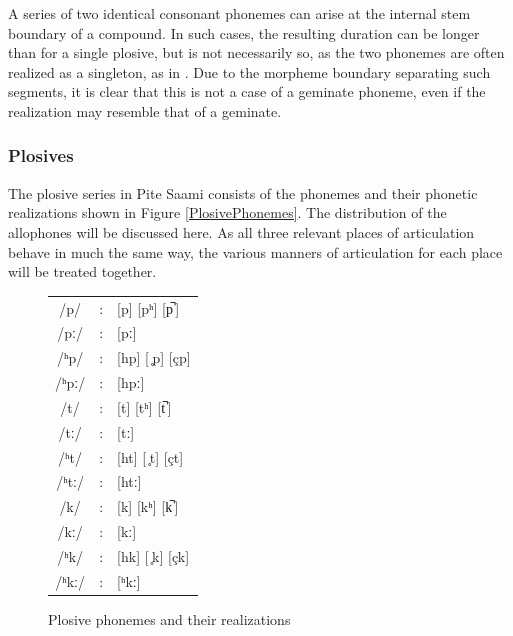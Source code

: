 A series of two identical consonant phonemes can arise at the internal stem boundary of a compound. In such cases, the resulting duration can be longer than for a single plosive, but is not necessarily so, as the two phonemes are often realized as a singleton, as in .
Due to the morpheme boundary separating such segments, it is clear that this is not a case of a geminate phoneme, even if the realization may resemble that of a geminate. 


\subsubsection{Plosives}\label{Plosives}%
The plosive series in Pite Saami consists of the phonemes and their phonetic realizations shown in Figure \vref{PlosivePhonemes}. The distribution of the allophones will be discussed here. As all three relevant places of articulation behave in much the same way, the various manners of articulation for each place will be treated together.
\begin{figure}\begin{center}
\begin{tabular}{c c l}
/p/ &:& [p] [pʰ] [p̚\,] \\ %
/pː/ &:& [pː] \\ %
/ʰp/ &:& [hp] [ ̥p] [çp]  \\ %
/ʰpː/ &:& [hpː] \\ %
/t/ &:& [t] [tʰ] [t̚\,] \\%
/tː/ &:& [tː] \\
/ʰt/ &:& [ht] [ ̥t] [çt] \\
/ʰtː/ &:& [htː] \\
/k/ &:& [k] [kʰ] [k̚\,] \\
/kː/ &:& [kː] \\
/ʰk/ &:& [hk] [ ̥k] [çk]  \\
/ʰkː/ &:& [ʰkː] \\
\end{tabular}
\end{center}
\caption{Plosive phonemes and their realizations}\label{PlosivePhonemes}
\end{figure}


